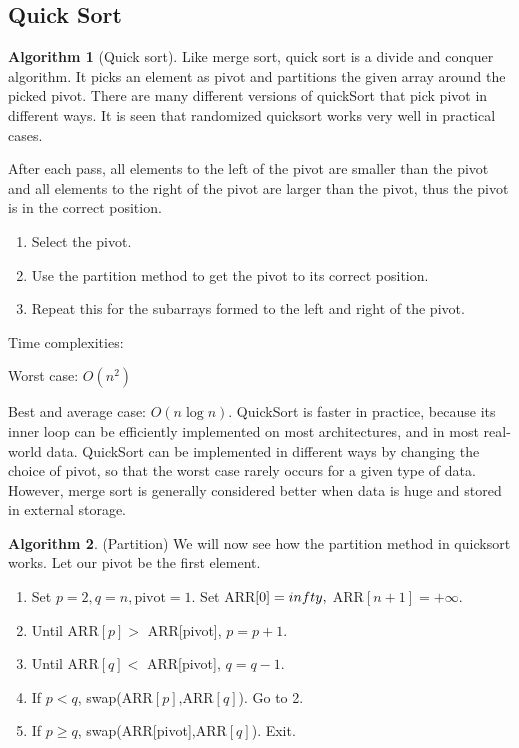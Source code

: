 \documentclass[10pt, a4paper]{extarticle}
\theoremstyle{definition}
\newtheorem{alg}{Algorithm}
\begin{document}
	\subsection{Quick Sort}
	\begin{alg}[Quick sort]
		Like merge sort, quick sort is a divide and conquer algorithm. It picks an element as pivot and partitions the given array around the picked pivot. There are many different versions of quickSort that pick pivot in different ways. It is seen that randomized quicksort works very well in practical cases. 

		After each pass, all elements to the left of the pivot are smaller than the pivot and all elements to the right of the pivot are larger than the pivot, thus the pivot is in the correct position.
		\begin{enumerate}
			\item Select the pivot.
			\item Use the partition method to get the pivot to its correct position.
			\item Repeat this for the subarrays formed to the left and right of the pivot.
	\end{enumerate}
	Time complexities:

	Worst case: $O(n^2)$

	Best and average case: $O(n\log n)$. QuickSort is faster in practice, because its inner loop can be efficiently implemented on most architectures, and in most real-world data. QuickSort can be implemented in different ways by changing the choice of pivot, so that the worst case rarely occurs for a given type of data. However, merge sort is generally considered better when data is huge and stored in external storage. 
	\end{alg}

	\begin{alg}(Partition)
		We will now see how the partition method in quicksort works. Let our pivot be the first element. 
		\begin{enumerate}
			\item Set $p=2,q=n, \text{pivot}=1$. Set ARR$[0]=\-infty,$ ARR$[n+1]=+\infty$.
			\item Until ARR$[p]>$ ARR[pivot], $p=p+1$.
			\item Until ARR$[q]<$ ARR[pivot], $q=q-1$.
			\item If $p<q$, swap(ARR$[p]$,ARR$[q]$). Go to 2.
			\item If $p\geq q$, swap(ARR[pivot],ARR$[q]$). Exit.
	\end{enumerate}
	\end{alg}
	
\end{document}
